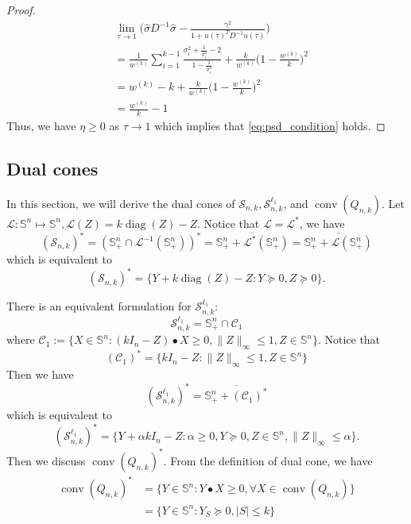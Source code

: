 \documentclass[11pt]{amsart}
\newcommand{\Szero}[2]{\ensuremath{\mathcal{S}_{#1,#2}}}
\newcommand{\Sone}[2]{\ensuremath{\mathcal{S}_{#1,#2}^{\ell_1}}}
\theoremstyle{plain}
\theoremstyle{definition}
\theoremstyle{remark}
\renewcommand{\SS}{{\mathbb{S}}}
\DeclareMathOperator{\conv}{conv}
\DeclareMathOperator{\diag}{diag}
\begin{document}
\begin{appendices}
\begin{proof}
\begin{equation}
				\begin{split}
					&\lim\limits_{\tau\rightarrow1} \Big(\hat\sigma D^{-1}\hat\sigma - \frac{\gamma^2}{1 + u(\tau)^TD^{-1}u(\tau)}\Big)\\
					&=\frac{1}{w^{(k)}}\sum_{i=1}^{k-1} \frac{\sigma_i^2 + \frac{1}{\sigma_i^2} - 2}{1-\frac{1}{\sigma_i^2}} + \frac{k}{w^{(k)}}\big(1 - \frac{w^{(k)}}{k}\big)^2\\
					&=w^{(k)} - k + \frac{k}{w^{(k)}}\big(1 - \frac{w^{(k)}}{k}\big)^2\\
					& =  \frac{w^{(k)}}{k}-1
				\end{split}
			\end{equation}
			Thus, we have $\eta\geq 0$ as $\tau\rightarrow 1$ which implies that \eqref{eq:psd_condition} holds. 
		\end{proof}
		
		\subsection{Dual cones}\label{append_dual_cones} In this section, we will derive the dual cones of \(\Szero{n}{k}, \Sone{n}{k}\), and \(\conv(Q_{n,k})\). Let \(\mathcal{L}: \SS^n \mapsto \SS^n, \mathcal{L}(Z) = k\diag(Z)-Z\). Notice that \(\mathcal{L} = \mathcal{L}^*\), we have
		\[
		(\Szero{n}{k})^* = (\SS^n_+ \cap \mathcal{L}^{-1}(\SS^n_+))^* = \overline{\SS^n_+ + \mathcal{L}^*(\SS^n_+)} = \overline{\SS^n_+ + \mathcal{L}(\SS^n_+)}
		\]
		which is equivalent to
		\[
		(\Szero{n}{k})^* = \{Y + k\diag(Z) - Z: Y \succeq 0, Z \succeq 0\}.
		\]
		
		There is an equivalent formulation for \Sone{n}{k}:
		\[
		\Sone{n}{k} = \SS^n_+\cap \mathcal{C}_1 
		\]
		where \(\mathcal{C}_1 := \{X\in\SS^n: (kI_n - Z) \bullet X \geq 0, \|Z\|_\infty \leq 1, Z\in \SS^n\}\). Notice that
		\[
		(\mathcal{C}_1 )^* = \{ kI_n - Z: \|Z\|_\infty \leq 1, Z\in \SS^n\}
		\]
		Then we have
		\[
		(\Sone{n}{k})^* = \overline{\SS^n_+ + (\mathcal{C}_1 )^*}
		\]
		which is equivalent to
		\[
		(\Sone{n}{k})^* = \{Y + \alpha kI_n - Z: \alpha\geq 0, Y \succeq0, Z\in\SS^n, \|Z\|_\infty \leq \alpha\}.
		\]
		Then we discuss \(\conv(Q_{n,k})^*\). From the definition of dual cone, we have
		\begin{equation}
			\begin{split}
				\conv(Q_{n,k})^* &= \{Y\in\SS^n: Y \bullet X \geq 0, \forall X\in \conv(Q_{n,k})\}\\
				&=\{Y\in\SS^n: Y_{S}\succeq 0, |S|\leq k \}
			\end{split}
		\end{equation}
		

\end{appendices}
\end{document}
